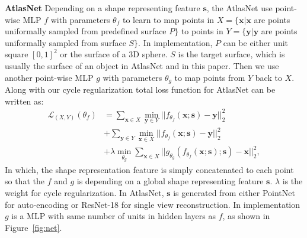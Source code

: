 \noindent\textbf{AtlasNet} Depending on a shape representing feature $\mathbf{s}$, the AtlasNet use point-wise MLP
$f$ with parameters $\theta_f$ to learn to map points in $X=\{\mathbf{x}| \mathbf{x}$ are points uniformally sampled from predefined surface $P\}$ to points in $Y=\{\mathbf{y}| \mathbf{y}$ are points uniformally sampled from surface $S\}$. In implementation, $P$ can be either unit square $[0,1]^2$ or the surface of a 3D sphere. $S$ is the target surface, which is usually the surface of an object in AtlasNet\cite{atlasnet} and in this paper. Then we use another point-wise MLP $g$ with parameters $\theta_g$ to map points from $Y$ back to $X$. Along with our cycle regularization  total loss function for AtlasNet can be written as:
\begin{equation}
\begin{aligned}
\label{equ:atlascycle}
\mathcal{L}_{(X,Y)}(\theta_f) &= \sum_{\mathbf{x} \in X} \min_{\mathbf{y} \in Y}|| f_{\theta_f}(\mathbf{x};\mathbf{s}) - \mathbf{y} ||_2^2 \\ &+ \sum_{ \mathbf{y} \in Y}\min_{ \mathbf{x} \in X} || f_{\theta_f}(\mathbf{x};\mathbf{s}) - \mathbf{y} ||_2^2 \\ &+ \lambda\min_{\theta_g}\sum_{\mathbf{x} \in X}||g_{\theta_g}(f_{\theta_f}(\mathbf{x};\mathbf{s});\mathbf{s}) - \mathbf{x}||_2^2,
\end{aligned}
 \end{equation}
In which, the shape representation feature is simply concatenated to each point so that the $f$ and $g$ is depending on a global shape representing feature $\mathbf{s}$. $\lambda$ is the weight for cycle regularization. In AtlasNet, $\mathbf{s}$ is generated from either PointNet\cite{resnet} for auto-encoding or ResNet-18\cite{resnet} for single view reconstruction. In implementation $g$ is a MLP with same number of units in hidden layers as $f$, as shown in Figure~\ref{fig:net}.

